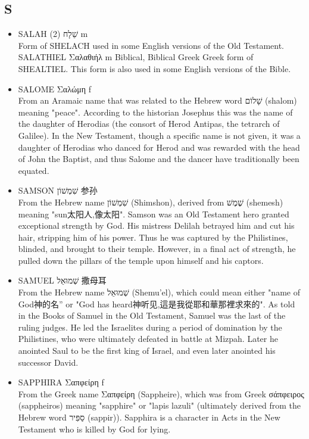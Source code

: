 \subsection{S}
\begin{itemize}
\itemsep-.5em 
\item SALAH (2) שֵׁלָח m\\
Form of SHELACH used in some English versions of the Old Testament.
SALATHIEL Σαλαθιήλ m Biblical, Biblical Greek
Greek form of SHEALTIEL. This form is also used in some English versions of the Bible.
\item SALOME Σαλώμη f \\
From an Aramaic name that was related to the Hebrew word שָׁלוֹם (shalom) meaning "peace". According to the historian Josephus this was the name of the daughter of Herodias (the consort of Herod Antipas, the tetrarch of Galilee). In the New Testament, though a specific name is not given, it was a daughter of Herodias who danced for Herod and was rewarded with the head of John the Baptist, and thus Salome and the dancer have traditionally been equated.
\item SAMSON שִׁמְשׁוֹן 参孙 \\
From the Hebrew name שִׁמְשׁוֹן (Shimshon), derived from שֶׁמֶשׁ (shemesh) meaning "sun太阳人,像太阳". Samson was an Old Testament hero granted exceptional strength by God. His mistress Delilah betrayed him and cut his hair, stripping him of his power. Thus he was captured by the Philistines, blinded, and brought to their temple. However, in a final act of strength, he pulled down the pillars of the temple upon himself and his captors.
\item SAMUEL שְׁמוּאֵל 撒母耳 \\
From the Hebrew name שְׁמוּאֵל (Shemu'el), which could mean either "name of God神的名” or "God has heard神听见,這是我從耶和華那裡求來的". As told in the Books of Samuel in the Old Testament, Samuel was the last of the ruling judges. He led the Israelites during a period of domination by the Philistines, who were ultimately defeated in battle at Mizpah. Later he anointed Saul to be the first king of Israel, and even later anointed his successor David.
\item SAPPHIRA Σαπφείρη f\\
From the Greek name Σαπφείρη (Sappheire), which was from Greek σάπφειρος (sappheiros) meaning "sapphire" or "lapis lazuli" (ultimately derived from the Hebrew word סַפִּיר (sappir)). Sapphira is a character in Acts in the New Testament who is killed by God for lying.

\end{itemize}
